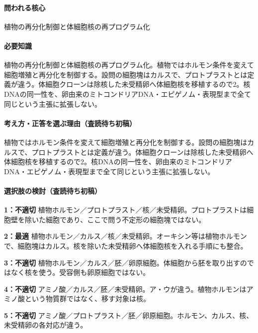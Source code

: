 \paragraph{問われる核心} 植物の再分化制御と体細胞核の再プログラム化

\paragraph{必要知識} 植物の再分化制御と体細胞核の再プログラム化。植物ではホルモン条件を変えて細胞増殖と再分化を制御する。設問の細胞塊はカルスで、プロトプラストとは定義が違う。体細胞クローンは除核した未受精卵へ体細胞核を移植するので2。核DNAの同一性を、卵由来のミトコンドリアDNA・エピゲノム・表現型まで全て同じという主張に拡張しない。

\paragraph{考え方・正答を選ぶ理由（査読待ち初稿）} 植物ではホルモン条件を変えて細胞増殖と再分化を制御する。設問の細胞塊はカルスで、プロトプラストとは定義が違う。体細胞クローンは除核した未受精卵へ体細胞核を移植するので2。核DNAの同一性を、卵由来のミトコンドリアDNA・エピゲノム・表現型まで全て同じという主張に拡張しない。

\paragraph{選択肢の検討（査読待ち初稿）}\mbox{}\par

\noindent\textbf{1：不適切} 植物ホルモン／プロトプラスト／核／未受精卵。プロトプラストは細胞壁を除いた細胞であり、ここで問う不定形の細胞塊ではない。\par

\noindent\textbf{2：最適} 植物ホルモン／カルス／核／未受精卵。オーキシン等は植物ホルモンで、細胞塊はカルス。核を除いた未受精卵へ体細胞核を入れる手順にも整合。\par

\noindent\textbf{3：不適切} 植物ホルモン／カルス／胚／卵原細胞。体細胞から胚を取り出すのではなく核を使う。受容側も卵原細胞ではない。\par

\noindent\textbf{4：不適切} アミノ酸／カルス／胚／未受精卵。ア・ウが違う。植物ホルモンはアミノ酸という物質群ではなく、移す対象は核。\par

\noindent\textbf{5：不適切} アミノ酸／プロトプラスト／胚／卵原細胞。ホルモン、カルス、核、未受精卵の各対応が違う。\par

